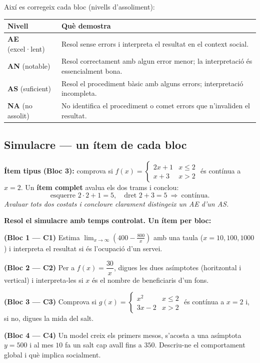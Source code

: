 \noindent Així es corregeix cada bloc (nivells d'assoliment):
\begin{center}
\renewcommand{\arraystretch}{1.3}
\begin{tabular}{p{2.4cm} p{10.2cm}}
\toprule
\textbf{Nivell} & \textbf{Què demostra} \\
\midrule
\textbf{AE} (excel·lent) & Resol sense errors i interpreta el resultat en el context
social. \\
\textbf{AN} (notable) & Resol correctament amb algun error menor; la interpretació és
essencialment bona. \\
\textbf{AS} (suficient) & Resol el procediment bàsic amb alguns errors; interpretació
incompleta. \\
\textbf{NA} (no assolit) & No identifica el procediment o comet errors que
n'invaliden el resultat. \\
\bottomrule
\end{tabular}
\end{center}

\subsection{Simulacre — un ítem de cada bloc}

\begin{exemple}
\textbf{Ítem tipus (Bloc 3):} comprova si
$f(x)=\begin{cases}2x+1 & x\le 2\\ x+3 & x>2\end{cases}$ és contínua a $x=2$. Un
\textbf{ítem complet} avalua els dos trams i conclou:
\[
\text{esquerre } 2\cdot 2+1=5,\quad \text{dret } 2+3=5 \ \Rightarrow\ \text{contínua}.
\]
\emph{Avaluar tots dos costats i concloure clarament distingeix un AE d'un AS.}
\end{exemple}

\begin{exercicis}
\textbf{Resol el simulacre amb temps controlat. Un ítem per bloc:}
\begin{exlist}
  \item \textbf{(Bloc 1 — C1)} Estima $\displaystyle\lim_{x\to\infty}\left(400-\frac{800}{x}\right)$
        amb una taula ($x=10,100,1000$) i interpreta el resultat si és l'ocupació d'un
        servei.
  \item \textbf{(Bloc 2 — C2)} Per a $f(x)=\dfrac{30}{x}$, digues les dues asímptotes
        (horitzontal i vertical) i interpreta-les si $x$ és el nombre de beneficiaris
        d'un fons.
  \item \textbf{(Bloc 3 — C3)} Comprova si
        $g(x)=\begin{cases}x^2 & x\le 2\\ 3x-2 & x>2\end{cases}$ és contínua a $x=2$ i,
        si no, digues la mida del salt.
  \item \textbf{(Bloc 4 — C4)} Un model creix els primers mesos, s'acosta a una
        asímptota $y=500$ i al mes $10$ fa un salt cap avall fins a $350$. Descriu-ne el
        comportament global i què implica socialment.
\end{exlist}
\end{exercicis}

